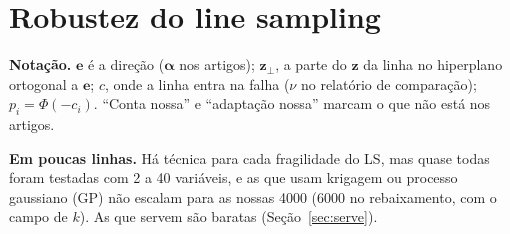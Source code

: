 \documentclass[11pt,a4paper]{article}
\begin{document}
\section{Robustez do line sampling}\label{sec:ls}
\textbf{Notação.} $\bm e$ é a direção ($\bm\alpha$ nos artigos); $\bm z_\perp$, a parte do $\bm z$ da linha no
hiperplano ortogonal a $\bm e$; $c$, onde a linha entra na falha ($\nu$ no relatório de comparação); $p_i =
\Phi(-c_i)$. ``Conta nossa'' e ``adaptação nossa'' marcam o que não está nos artigos.

\textbf{Em poucas linhas.} Há técnica para cada fragilidade do LS, mas quase todas foram testadas com 2 a 40
variáveis, e as que usam krigagem ou processo gaussiano (GP) não escalam para as nossas 4000 (6000 no rebaixamento, com
o campo de $k$). As que servem são baratas (Seção~\ref{sec:serve}).
\end{document}
